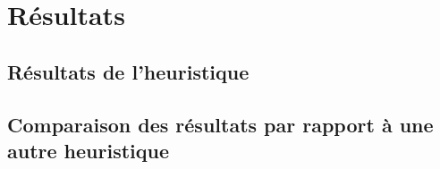 \chapter{Résultats}


\section{Résultats de l'heuristique}

%


\section{Comparaison des résultats par rapport à une autre heuristique}

%